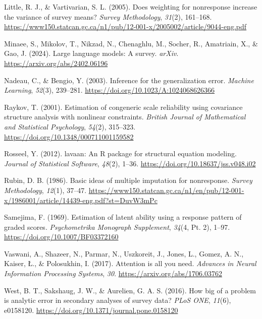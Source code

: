 \documentclass[
  man,
  floatsintext,
  longtable,
  nolmodern,
  notxfonts,
  notimes,
  colorlinks=true,linkcolor=blue,citecolor=blue,urlcolor=blue]{apa7}
\newlength{\cslhangindent}
\newenvironment{CSLReferences}[2] %
 {\begin{list}{}{%
  \setlength{\itemindent}{0pt}
  \setlength{\leftmargin}{0pt}
  \setlength{\parsep}{0pt}
  \ifodd #1
   \setlength{\leftmargin}{\cslhangindent}
   \setlength{\itemindent}{-1\cslhangindent}
  \fi
  \setlength{\itemsep}{#2\baselineskip}}}
 {\end{list}}
\begin{document}
\begin{CSLReferences}{1}{0}
Little, R. J., \& Vartivarian, S. L. (2005). Does weighting for
nonresponse increase the variance of survey means? \emph{Survey
Methodology}, \emph{31}(2), 161--168.
\url{https://www150.statcan.gc.ca/n1/pub/12-001-x/2005002/article/9044-eng.pdf}

Minaee, S., Mikolov, T., Nikzad, N., Chenaghlu, M., Socher, R.,
Amatriain, X., \& Gao, J. (2024). Large language models: A survey.
\emph{arXiv}. \url{https://arxiv.org/abs/2402.06196}

Nadeau, C., \& Bengio, Y. (2003). Inference for the generalization
error. \emph{Machine Learning}, \emph{52}(3), 239--281.
\url{https://doi.org/10.1023/A:1024068626366}

Raykov, T. (2001). Estimation of congeneric scale reliability using
covariance structure analysis with nonlinear constraints. \emph{British
Journal of Mathematical and Statistical Psychology}, \emph{54}(2),
315--323. \url{https://doi.org/10.1348/000711001159582}

Rosseel, Y. (2012). {lavaan}: An {R} package for structural equation
modeling. \emph{Journal of Statistical Software}, \emph{48}(2), 1--36.
\url{https://doi.org/10.18637/jss.v048.i02}

Rubin, D. B. (1986). Basic ideas of multiple imputation for nonresponse.
\emph{Survey Methodology}, \emph{12}(1), 37--47.
\url{https://www150.statcan.gc.ca/n1/en/pub/12-001-x/1986001/article/14439-eng.pdf?st=DuvW3mPc}

Samejima, F. (1969). Estimation of latent ability using a response
pattern of graded scores. \emph{Psychometrika Monograph Supplement},
\emph{34}(4, Pt. 2), 1--97. \url{https://doi.org/10.1007/BF03372160}

Vaswani, A., Shazeer, N., Parmar, N., Uszkoreit, J., Jones, L., Gomez,
A. N., Kaiser, Ł., \& Polosukhin, I. (2017). Attention is all you need.
\emph{Advances in Neural Information Processing Systems}, \emph{30}.
\url{https://arxiv.org/abs/1706.03762}

West, B. T., Sakshaug, J. W., \& Aurelien, G. A. S. (2016). How big of a
problem is analytic error in secondary analyses of survey data?
\emph{PLoS ONE}, \emph{11}(6), e0158120.
\url{https://doi.org/10.1371/journal.pone.0158120}


\end{CSLReferences}
\end{document}
